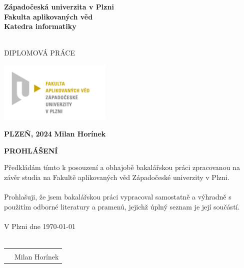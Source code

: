 \documentclass[12pt]{article}
\begin{document}
    \begin{titlepage}
        \begin{center}
            \vspace*{1cm}

            \Large
            \textbf{
                Západočeská univerzita v Plzni\\
                Fakulta aplikovaných věd\\
                Katedra informatiky\\
                }

            \vfill

            \Huge
            \textbf{}\\
            \vspace*{1cm}
            \Large
            {DIPLOMOVÁ PRÁCE}

            \vfill

            \includegraphics[width=0.4\textwidth]{pic/fav.jpg}

            \vspace*{3cm}

            \Large
            \textbf{PLZEŇ, 2024} \hfill \textbf{Milan Horínek}
            
        \end{center}
    \end{titlepage}

    \hspace{0pt}
    \vfill

    \begin{center}
        \Large\textbf{PROHLÁŠENÍ}
    \end{center}    
    
    \vspace*{0.5cm}
        
    \noindent 
    Předkládám tímto k posouzení a obhajobě bakalářskou práci zpracovanou na
    závěr studia na Fakultě aplikovaných věd Západočeské univerzity v Plzni.
    \\\\
    Prohlašuji, že jsem bakalářskou práci vypracoval samostatně a výhradně
    s použitím odborné literatury a pramenů, jejichž úplný seznam je její součástí.
    \\\\
    V Plzni dne \today \\\\ 
    \begin{tabular}{p{10cm}p{5cm}}
        &   \dotfill \\
        &   \centering Milan Horínek
    \end{tabular}
\end{document}
